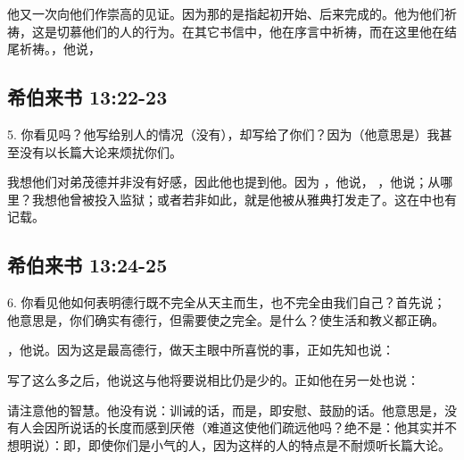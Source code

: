 他又一次向他们作崇高的见证。因为那的是指起初开始、后来完成的。他为他们祈祷，这是切慕他们的人的行为。在其它书信中，他在序言中祈祷，而在这里他在结尾祈祷。，他说，\par


\subsection{希伯来书 13:22-23}

5. 你看见吗？他写给别人的情况（没有），却写给了你们？因为（他意思是）我甚至没有以长篇大论来烦扰你们。\par

我想他们对弟茂德并非没有好感，因此他也提到他。因为 ，他说， ，他说；从哪里？我想他曾被投入监狱；或者若非如此，就是他被从雅典打发走了。这在中也有记载。\par


\subsection{希伯来书 13:24-25}

6. 你看见他如何表明德行既不完全从天主而生，也不完全由我们自己？首先说；他意思是，你们确实有德行，但需要使之完全。是什么？使生活和教义都正确。\par

，他说。因为这是最高德行，做天主眼中所喜悦的事，正如先知也说：\par

写了这么多之后，他说这与他将要说相比仍是少的。正如他在另一处也说：\par

请注意他的智慧。他没有说：训诫的话，而是，即安慰、鼓励的话。他意思是，没有人会因所说话的长度而感到厌倦（难道这使他们疏远他吗？绝不是：他其实并不想明说）：即，即使你们是小气的人，因为这样的人的特点是不耐烦听长篇大论。\par

